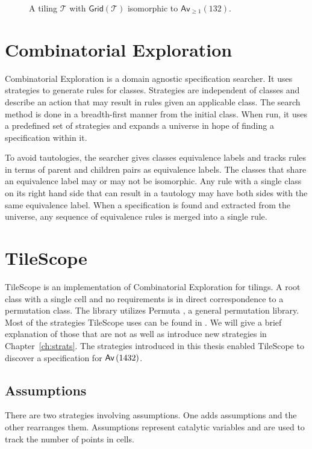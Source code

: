 \begin{figure}[htbp]
    \centering
    
    \caption{A tiling $\mathcal{T}$ with $\textsf{Grid}(\mathcal{T})$ isomorphic to $\textsf{Av}_{\geq1}(132)$.}
    \label{fig:tiling132}
\end{figure}

\section{Combinatorial Exploration}
Combinatorial Exploration \cite{css} is a domain agnostic specification searcher. It uses strategies to generate rules for classes. Strategies are independent of classes and describe an action that may result in rules given an applicable class. The search method is done in a breadth-first manner from the initial class. When run, it uses a predefined set of strategies and expands a universe in hope of finding a specification within it.

To avoid tautologies, the searcher gives classes equivalence labels and tracks rules in terms of parent and children pairs as equivalence labels. The classes that share an equivalence label may or may not be isomorphic. Any rule with a single class on its right hand side that can result in a tautology may have both sides with the same equivalence label. When a specification is found and extracted from the universe, any sequence of equivalence rules is merged into a single rule.

\section{TileScope}
TileScope \cite{tiling} is an implementation of Combinatorial Exploration for tilings. A root class with a single cell and no requirements is in direct correspondence to a permutation class. The library utilizes Permuta \cite{permuta}, a general permutation library. Most of the strategies TileScope uses can be found in . We will give a brief explanation of those that are not as well as introduce new strategies in Chapter~\ref{ch:strats}. The strategies introduced in this thesis enabled TileScope to discover a specification for $\textsf{Av}\left(1432\right)$.


\subsection{Assumptions}
There are two strategies involving assumptions. One adds assumptions and the other rearranges them. Assumptions represent catalytic variables and are used to track the number of points in cells. 

